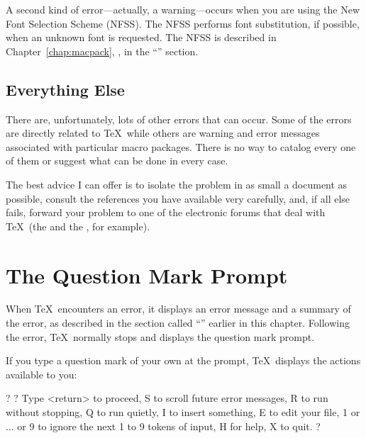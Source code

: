 A second kind of error---actually, a warning---occurs when you are
using the New Font Selection Scheme 
(NFSS).  The NFSS performs font
substitution, if possible, when an unknown font is requested.  The
NFSS is described in Chapter~\ref{chap:macpack},
{\it {}}, in the ``'' section.

\subsection{Everything Else}

There are, unfortunately, lots of other errors that can occur.  Some
of the errors are directly related to \TeX\ while others are warning and
error messages associated with particular macro packages.  There is
no way to catalog every one of them or suggest what can be done in every
case.  

The best advice I can offer is to isolate the problem
in as small a document as possible, consult the references you have available
very carefully, and, if all else fails, forward your problem to one of the
electronic forums that deal with \TeX\ 
(the 
and the , for example).

\section{The Question Mark Prompt}
\label{sec:qprompt}

When \TeX\ encounters an error, it displays an error message and a
summary of the error, as described in the section called
``'' earlier in this chapter.  Following the
error, \TeX\ normally stops and displays the question mark prompt.

\newpage
If you type a question mark of your own at the prompt, \TeX\ displays
the actions available to you:

\begin{ttindent}
? ?
Type <return> to proceed,
S to scroll future error messages,
R to run without stopping, Q to run quietly,
I to insert something, E to edit your file,
1 or ... or 9 to ignore the next 1 to 9 tokens
of input, H for help, X to quit.
?
\end{ttindent}

